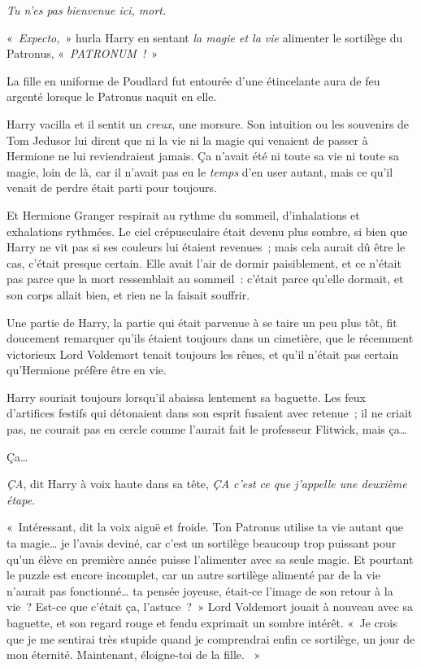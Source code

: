 \emph{Tu n'es pas bienvenue ici, mort.}

«~\emph{Expecto,}~» hurla Harry en sentant \emph{la magie et la vie} alimenter le sortilège du Patronus, «~\emph{PATRONUM~!}~»

La fille en uniforme de Poudlard fut entourée d'une étincelante aura de feu argenté lorsque le Patronus naquit en elle.

Harry vacilla et il sentit un \emph{creux}, une morsure. Son intuition ou les souvenirs de Tom Jedusor lui dirent que ni la vie ni la magie qui venaient de passer à Hermione ne lui reviendraient jamais. Ça n'avait été ni toute sa vie ni toute sa magie, loin de là, car il n'avait pas eu le \emph{temps} d'en user autant, mais ce qu'il venait de perdre était parti pour toujours.

Et Hermione Granger respirait au rythme du sommeil, d'inhalations et exhalations rythmées. Le ciel crépusculaire était devenu plus sombre, si bien que Harry ne vit pas si ses couleurs lui étaient revenues~; mais cela aurait dû être le cas, c'était presque certain. Elle avait l'air de dormir paisiblement, et ce n'était pas parce que la mort ressemblait au sommeil~: c'était parce qu'elle dormait, et son corps allait bien, et rien ne la faisait souffrir.

Une partie de Harry, la partie qui était parvenue à se taire un peu plus tôt, fit doucement remarquer qu'ils étaient toujours dans un cimetière, que le récemment victorieux Lord Voldemort tenait toujours les rênes, et qu'il n'était pas certain qu'Hermione préfère être en vie.

Harry souriait toujours lorsqu'il abaissa lentement sa baguette. Les feux d'artifices festifs qui détonaient dans son esprit fusaient avec retenue~; il ne criait pas, ne courait pas en cercle comme l'aurait fait le professeur Flitwick, mais ça…

Ça…

\emph{ÇA}, dit Harry à voix haute dans sa tête, \emph{ÇA c'est ce que j'appelle une deuxième étape.}

«~Intéressant, dit la voix aiguë et froide. Ton Patronus utilise ta vie autant que ta magie… je l'avais deviné, car c'est un sortilège beaucoup trop puissant pour qu'un élève en première année puisse l'alimenter avec sa seule magie. Et pourtant le puzzle est encore incomplet, car un autre sortilège alimenté par de la vie n'aurait pas fonctionné… ta pensée joyeuse, était-ce l'image de son retour à la vie~? Est-ce que c'était ça, l'astuce~?~» Lord Voldemort jouait à nouveau avec sa baguette, et son regard rouge et fendu exprimait un sombre intérêt. «~Je crois que je me sentirai très stupide quand je comprendrai enfin ce sortilège, un jour de mon éternité. Maintenant, éloigne-toi de la fille. ~»

